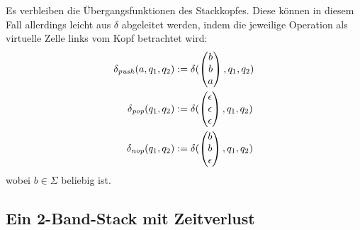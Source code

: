 \documentclass{article}
\begin{document}
Es verbleiben die Übergangsfunktionen des Stackkopfes. Diese können in diesem Fall allerdings leicht aus $\delta$ abgeleitet werden, indem die jeweilige Operation als virtuelle Zelle links vom Kopf betrachtet wird:
\begin{align*}
    \delta_{\mathit{push}}(a, q_1, q_2) &:= \delta(\begin{pmatrix}b\\b\\a\end{pmatrix}, q_1, q_2) \\
    \delta_{\mathit{pop}}(q_1, q_2) &:= \delta(\begin{pmatrix}\epsilon\\\epsilon\\\epsilon\end{pmatrix}, q_1, q_2) \\
    \delta_{\mathit{nop}}(q_1, q_2) &:= \delta(\begin{pmatrix}b\\b\\\epsilon\end{pmatrix}, q_1, q_2) \\
\end{align*}
wobei $b \in \Sigma$ beliebig ist.

\subsection{Ein 2-Band-Stack mit Zeitverlust}
\end{document}
